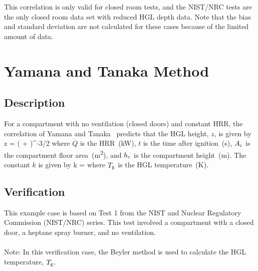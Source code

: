 This correlation is only valid for closed room tests, and the NIST/NRC tests are the only closed room data set with reduced HGL depth data. Note that the bias and standard deviation are not calculated for these cases because of the limited amount of data.


\clearpage


\section{Yamana and Tanaka Method}

\subsection*{Description}

For a compartment with no ventilation (closed doors) and constant HRR, the correlation of Yamana and Tanaka~\cite{Tanaka:1} predicts that the HGL height, $z$, is given by
\be
z = \left(  +  \right)^{-3/2}
\label{eq:Yamana_Tanaka}
\ee
where $\dot Q$ is the HRR~(\si{kW}), $t$ is the time after ignition~(\si{s}), $A\sb{c}$ is the compartment floor area~(\si{m^2}), and $h\sb{c}$ is the compartment height~(\si{m}). The constant $k$ is given by
\be
k = 
\ee
where $T\sb{g}$ is the HGL temperature~(\si{K}).


\clearpage


\subsection*{Verification}

This example case is based on Test 1 from the NIST and Nuclear Regulatory Commission (NIST/NRC) series. This test involved a compartment with a closed door, a heptane spray burner, and no ventilation.
\\ \\
\noindent Note: In this verification case, the Beyler method is used to calculate the HGL temperature, $T\sb{g}$.



